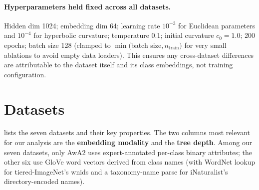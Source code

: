 \documentclass{article}
\begin{document}
\paragraph{Hyperparameters held fixed across all datasets.}
Hidden dim 1024; embedding dim 64; learning rate $10^{-3}$ for Euclidean parameters and $10^{-4}$ for hyperbolic curvature; temperature 0.1; initial curvature $c_0 = 1.0$; 200 epochs; batch size 128 (clamped to $\min($batch size$, n_{\text{train}})$ for very small ablations to avoid empty data loaders).
This ensures any cross-dataset differences are attributable to the dataset itself and its class embeddings, not training configuration.

\section{Datasets}\label{sec:datasets}

 lists the seven datasets and their key properties.
The two columns most relevant for our analysis are the \textbf{embedding modality} and the \textbf{tree depth}.
Among our seven datasets, only AwA2 uses expert-annotated per-class binary attributes; the other six use GloVe word vectors derived from class names (with WordNet lookup for tiered-ImageNet's wnids and a taxonomy-name parse for iNaturalist's directory-encoded names).
\end{document}
